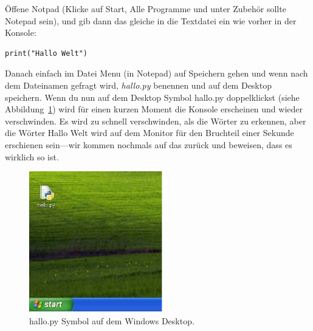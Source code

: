 \begin{WINDOWS}
Öffene Notpad (Klicke auf Start, Alle Programme und unter Zubehör sollte Notepad sein), und gib dann das gleiche in die Textdatei ein wie vorher in der Konsole:

\begin{Verbatim}[frame=single]
print("Hallo Welt")
\end{Verbatim}

Danach einfach im Datei Menu (in Notepad) auf Speichern gehen und wenn nach dem Dateinamen gefragt wird, \emph{hallo.py} benennen und auf dem Desktop speichern. Wenn du nun auf dem Desktop Symbol hallo.py doppelklickst (siehe Abbildung~\ref{fig5}) wird für einen kurzen Moment die Konsole erscheinen und wieder verschwinden. Es wird zu schnell verschwinden, als die Wörter zu erkennen, aber die Wörter Hallo Welt wird auf dem Monitor für den Bruchteil einer Sekunde erschienen sein---wir kommen nochmals auf das zurück und beweisen, dass es wirklich so ist.\\

\begin{figure}
\begin{center}
\includegraphics[width=58mm]{images/figure5}
\end{center}
\caption{hallo.py Symbol auf dem Windows Desktop.}\label{fig5}
\end{figure}
\end{WINDOWS}

